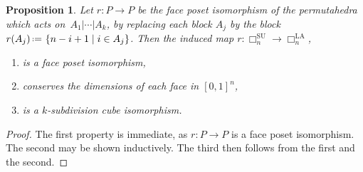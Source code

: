 \documentclass{amsart}
\newtheorem{proposition}[theorem]{Proposition}
\theoremstyle{definition}
\newcommand{\set}[2]{\left\{ #1 \;\middle|\; #2 \right\}} %
\newcommand{\eqdef}{\mbox{\,\raisebox{0.2ex}{\scriptsize\ensuremath{\mathrm:}}\ensuremath{=}\,}} %
\newcommand{\SU}{\mathrm{SU}}
\newcommand{\LA}{\mathrm{LA}}
\newcommand{\divcube}[1]{\Box_{#1}}
\begin{document}
\begin{proposition}
\label{prop:r is a k-subdiv cube isomorphism}
Let $r:P\to P$ be the face poset isomorphism of the permutahedra which acts on~$A_1| \cdots |A_k$, by replacing each block $A_j$ by the block $r(A_j)\eqdef\set{n-i+1}{i \in A_j}$.
Then the induced map $r:\divcube{n}^{\SU}\to \divcube{n}^{\LA}$,
\begin{enumerate}
\item is a face poset isomorphism,
\item conserves the dimensions of each face in $[0,1]^{n}$,
\item is a $k$-subdivision cube isomorphism.
\end{enumerate}
\end{proposition}

\begin{proof}
The first property is immediate, as $r:P\to P$ is a face poset isomorphism.
The second may be shown inductively.
The third then follows from the first and the second.
\end{proof}
\end{document}
